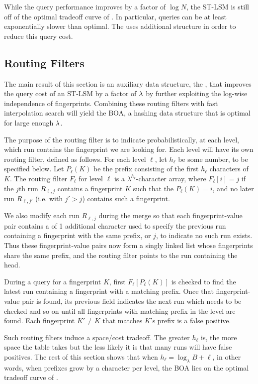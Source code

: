 While the query performance improves by a factor of $\log{N}$, the ST-LSM
is still off of the optimal tradeoff curve of . In
particular, queries can be at least exponentially slower than optimal. The
\boa{} uses additional structure in order to reduce this query cost.

\subsection{Routing Filters}\label{sec:boa-routing-filter}
The main result of this section is an auxiliary data structure, the
, that improves the query cost of an ST-LSM by a
factor of $\lambda$ by further exploiting the log-wise independence of
fingerprints.  Combining these routing filters with fast interpolation
search will yield the BOA, a hashing data structure that is optimal
for large enough $\lambda$. 

The purpose of the routing filter is to indicate probabilistically, at each
level, which run contains the fingerprint we are looking for. Each level will
have its own routing filter, defined as follows. For each level $\ell$, let
$h_\ell$ be some number, to be specified below. Let $P_\ell(K)$ be the prefix
consisting of the first $h_\ell$ characters of $K$. The routing filter $F_\ell$
for level $\ell$ is a $\lambda^{h_\ell}$-character array, where $F_\ell[i] = j$
if the $j$th run $R_{\ell,j}$ contains a fingerprint $K$ such that the
$P_\ell(K)=i$, and no later run $R_{\ell,j'}$ (i.e. with $j'>j$) contains such
a fingerprint.

We also modify each run $R_{\ell, j}$ during the merge so that each
fingerprint-value pair contains a  of 1 additional
character used to specify the previous run containing a fingerprint with the
same prefix, or $j$, to indicate no such run exists. Thus these fingerprint-value
pairs now form a singly linked list whose fingerprints share the same prefix,
and the routing filter points to the run containing the head.

During a query for a fingerprint $K$, first $F_\ell[P_\ell(K)]$ is checked to
find the latest run containing a fingerprint with a matching prefix. Once that
fingerprint-value pair is found, its previous field indicates the next run
which needs to be checked and so on until all fingerprints with matching prefix
in the level are found. Each fingerprint $K'\neq K$ that matches $K$'s prefix
is a false positive.

Such routing filters induce a space/cost tradeoff. The greater $h_\ell$ is, the
more space the table takes but the less likely it is that many runs will have
false positives. The rest of this section shows that when $h_\ell=\log_\lambda
B + \ell$, in other words, when prefixes grow by a character per level, the BOA
lies on the optimal tradeoff curve of .

